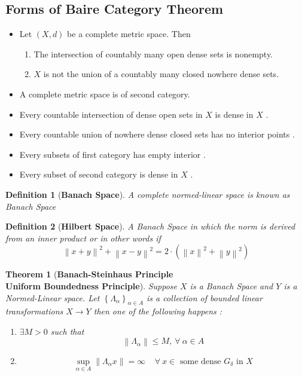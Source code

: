 \documentclass{article}
\newcommand{\set}[1]{\left\{#1\right\}}
\newcommand{\norm}[1]{\left\lVert {#1} \right\rVert}
\newtheorem{theorem}{Theorem}[section]
\newtheorem{defn}{Definition}[section]
\begin{document}
\subsection{\Large Forms of Baire Category Theorem}
\begin{itemize}
	\item Let $(X, d)$ be a complete metric space. Then 
	\begin{enumerate}[label=(\alph*)]
		\item The intersection of countably many open dense sets is nonempty.
		\item $X$ is not the union of a countably many closed nowhere dense sets.
	\end{enumerate}
	\item A complete metric space is of second category.
	\item  Every countable intersection of dense open sets in $X$ is dense in $X$ .
	\item  Every countable union of nowhere dense closed sets has no interior points .
	\item Every subsets of first category has empty interior .
	\item  Every subset of second category is dense in $X$ .
\end{itemize}
\begin{defn}[\textbf{Banach Space}]
	A complete normed-linear space is known as Banach Space 
\end{defn}
\begin{defn}[\textbf{Hilbert Space}]
	A Banach Space in which the norm is derived from an inner product or in other words if \[\norm{x+y}^2+\norm{x-y}^2 = 2\cdot \left(\norm{x}^2+\norm{y}^2\right)\]
\end{defn}

\begin{theorem}[\textbf{Banach-Steinhaus Principle \\ Uniform Boundedness Principle}]
	Suppose $X$ is a Banach Space and $Y$ is a Normed-Linear space. Let $\set{\Lambda_{\alpha}}_{\alpha\in A}$ is a collection of bounded linear transformations $X\to Y$ then one of the following happens :\begin{enumerate}[label = (\alph*)]
		\item $\exists M>0$ such that \[\norm{\Lambda_{\alpha}}\leq M ,\ \forall \ \alpha\in A\] 
		\item \[\sup_{\alpha\in A}\norm{\Lambda_{\alpha}x} = \infty \ \ \text{  $\forall \ x\in$ some dense $G_{\delta}$ in $X$}\]
	\end{enumerate}
\end{theorem}
\end{document}
